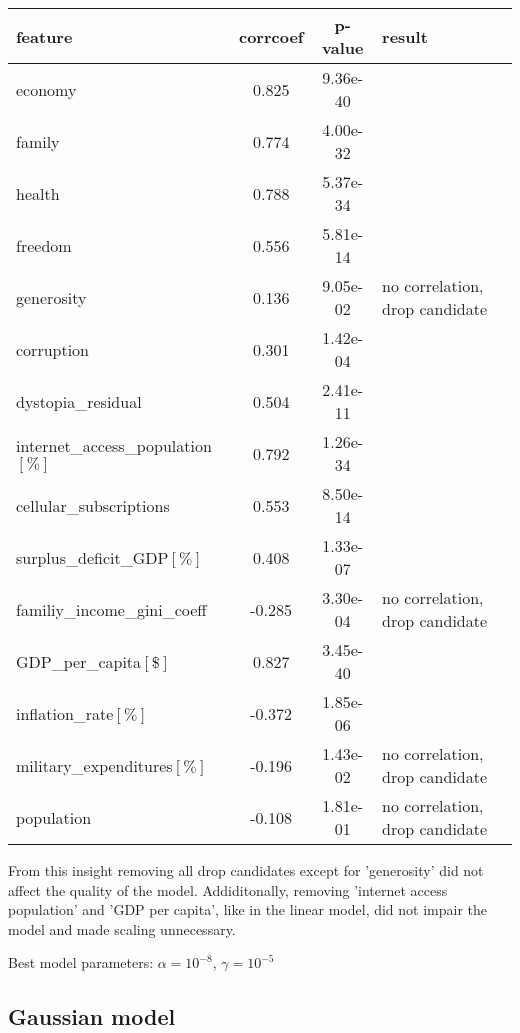 \documentclass[11pt]{article}
\begin{document}
\begin{tabular}{|l|c|c|l|}
\hline
feature & corrcoef & p-value & result\\
\hline
economy                       & 0.825 & 9.36e-40 &\\
family                        & 0.774 & 4.00e-32 &\\
health                        & 0.788 & 5.37e-34 &\\
freedom                       & 0.556 & 5.81e-14 &\\
generosity                    & 0.136 & 9.05e-02 & no correlation, drop candidate\\
corruption                    & 0.301 & 1.42e-04 &\\
dystopia\_residual             & 0.504 & 2.41e-11 &\\
internet\_access\_population$\left[\%\right]$ & 0.792 & 1.26e-34 &\\
cellular\_subscriptions        & 0.553 & 8.50e-14 &\\
surplus\_deficit\_GDP$\left[\%\right]$        & 0.408 & 1.33e-07 &\\
familiy\_income\_gini\_coeff     & -0.285 & 3.30e-04 & no correlation, drop candidate\\
GDP\_per\_capita$\left[\$\right]$             & 0.827 & 3.45e-40 &\\
inflation\_rate$\left[\%\right]$             & -0.372 & 1.85e-06 &\\
military\_expenditures$\left[\%\right]$      & -0.196 & 1.43e-02 & no correlation, drop candidate\\
population                    & -0.108 & 1.81e-01 & no correlation, drop candidate\\
\hline
\end{tabular}

\hspace{.4cm}

From this insight removing all drop candidates except for 'generosity'
did not affect the quality of the model. Addiditonally, removing
'internet access population' and 'GDP per capita', like in the linear
model, did not impair the model and made scaling unnecessary.\newline

Best model parameters: \(\alpha = 10^{-8}\), \(\gamma = 10^{-5}\)

    \subsection{Gaussian model}\label{gaussian-model}
\end{document}
